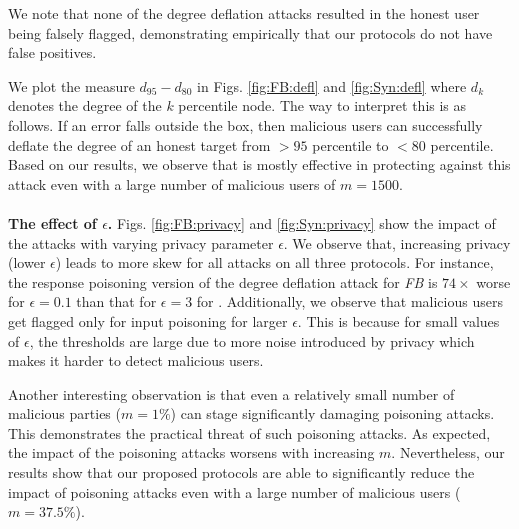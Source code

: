 We note that none of the degree deflation attacks resulted in the honest user being falsely flagged, demonstrating empirically  that our protocols do not have false positives.

We plot the measure $d_{95}-d_{80}$ in Figs. \ref{fig:FB:defl} and \ref{fig:Syn:defl} where $d_{k}$ denotes the degree of the $k$ percentile node. The way to interpret this is as follows. If an error falls outside the box, then malicious users can successfully deflate the degree of an honest target from $>95$ percentile to $<80$ percentile. Based on our results, we observe that \DegHybrid{} is mostly effective in protecting against this attack even with a large number of malicious users of $m=1500$. 
\vspace{-0.2cm}\\\\
\noindent\textbf{The effect of $\epsilon$.} Figs. \ref{fig:FB:privacy} and \ref{fig:Syn:privacy} show the impact of the attacks with varying privacy parameter $\epsilon$. We observe that, increasing privacy (lower $\epsilon$) leads to more skew for all attacks on all three protocols. For instance, the response poisoning version of the degree deflation attack for \textit{FB}  is $74\times$ worse for $\epsilon=0.1$ than that for $\epsilon=3$ for \DegRRCheck{}. Additionally, we observe that malicious users get flagged only for input poisoning for larger $\epsilon$. This is because for small values of $\epsilon$, the thresholds are large due to more noise introduced by privacy which makes it harder to detect malicious users. 
\par Another interesting observation is that even a relatively small number of malicious parties ($m=1\%$) can stage significantly damaging poisoning attacks. This demonstrates the practical threat of such poisoning attacks. As expected, the impact of the poisoning attacks worsens with increasing $m$. Nevertheless, our results show that our proposed protocols are able to significantly reduce the impact of poisoning attacks even with a large number of malicious users ($m=37.5\%$).

